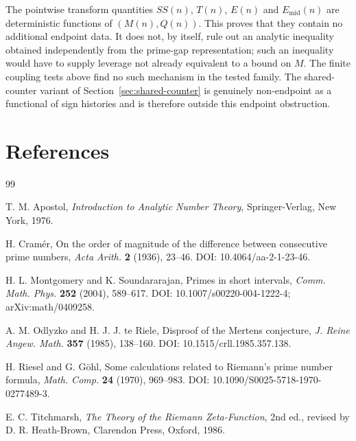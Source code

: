 \documentclass[11pt]{amsart}
\numberwithin{equation}{section}
\theoremstyle{plain}
\theoremstyle{definition}
\theoremstyle{remark}
\begin{document}
The pointwise transform quantities $SS(n)$, $T(n)$, $E(n)$ and
$E_{\mathrm{mid}}(n)$ are deterministic functions of $(M(n),Q(n))$. This proves
that they contain no additional endpoint data. It does not, by itself, rule out an
analytic inequality obtained independently from the prime-gap representation; such an
inequality would have to supply leverage not already equivalent to a bound on $M$. The
finite coupling tests above find no such mechanism in the tested family. The shared-counter
variant of Section~\ref{sec:shared-counter} is genuinely non-endpoint as a functional
of sign histories and is therefore outside this endpoint obstruction.

\section*{References}
\label{sec:references}
\begin{thebibliography}{99}

T. M. Apostol,
\emph{Introduction to Analytic Number Theory},
Springer-Verlag, New York, 1976.

H. Cram\'er,
On the order of magnitude of the difference between consecutive prime numbers,
\emph{Acta Arith.} \textbf{2} (1936), 23--46.
DOI: 10.4064/aa-2-1-23-46.

H. L. Montgomery and K. Soundararajan,
Primes in short intervals,
\emph{Comm. Math. Phys.} \textbf{252} (2004), 589--617.
DOI: 10.1007/s00220-004-1222-4; arXiv:math/0409258.

A. M. Odlyzko and H. J. J. te Riele,
Disproof of the Mertens conjecture,
\emph{J. Reine Angew. Math.} \textbf{357} (1985), 138--160.
DOI: 10.1515/crll.1985.357.138.

H. Riesel and G. G\"ohl,
Some calculations related to Riemann's prime number formula,
\emph{Math. Comp.} \textbf{24} (1970), 969--983.
DOI: 10.1090/S0025-5718-1970-0277489-3.

E. C. Titchmarsh,
\emph{The Theory of the Riemann Zeta-Function},
2nd ed., revised by D. R. Heath-Brown, Clarendon Press, Oxford, 1986.

\end{thebibliography}
\end{document}
